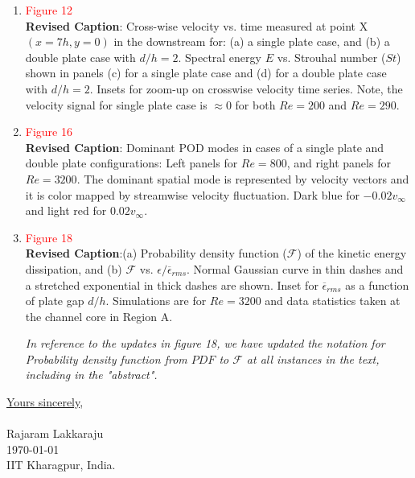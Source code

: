 \documentclass[onecolumn,a4paper,amsmath,amssym,pre]{revtex4}
\begin{document}
\begin{enumerate}
    	\item \textcolor{red}{Figure 12}\\
    	\textbf{Revised Caption}: Cross-wise velocity vs. time measured at point {\normalsize{X}}$(x=7h,y=0)$ in the downstream for: (a) a single plate case, and (b) a double plate case with $d/h=2$. Spectral energy $E$ vs. Strouhal number ($St$) shown in panels (c) for a single plate case and (d) for a double plate case with $d/h=2$. Insets for zoom-up on crosswise velocity time series. Note, the velocity signal for single plate case is $\approx0$ for both $Re=200$ and $Re=290$.  	
    	    	
    	\item \textcolor{red}{Figure 16}\\
    	\textbf{Revised Caption}: Dominant POD modes in cases of a single plate and double plate configurations: Left panels for $Re=800$, and right panels for $Re=3200$. The dominant spatial mode is represented by velocity vectors and it is color mapped by streamwise velocity fluctuation. Dark blue for $-0.02 {v_{\infty}}$ and light red for $0.02{v_{\infty}}$.
    	
    	\item \textcolor{red}{Figure 18}\\
    	\textbf{Revised Caption}:(a) Probability density function ($\mathcal{F}$) of the kinetic energy dissipation, and (b) $\mathcal{F}$ vs. $\epsilon/\overline{\epsilon}_{rms}$. Normal Gaussian curve in thin dashes and a stretched exponential in thick dashes are shown. Inset for $\overline{\epsilon}_{rms}$ as a function of plate gap $d/h$. Simulations are for $Re=3200$ and data statistics taken at the channel core in Region A.
    
    	\textit{In reference to the updates in figure 18, we have updated the notation for Probability density function from $PDF$ to $\mathcal{F}$ at all instances in the text, including in the "abstract".}
    	
    	
    	
    \end{enumerate}
    
    
    
    \vspace{1cm} 
    \underline{Yours sincerely}, \\
    \vspace{0.3cm} \\
    Rajaram Lakkaraju  \\
    \today \\
    IIT Kharagpur, India.
    
\end{document}
